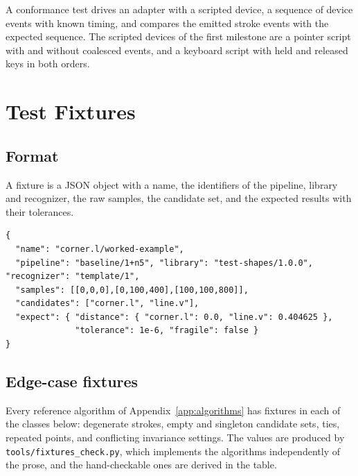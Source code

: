 A conformance test drives an adapter with a scripted device, a sequence of device events with known timing, and compares the emitted stroke events with the expected sequence. The scripted devices of the first milestone are a pointer script with and without coalesced events, and a keyboard script with held and released keys in both orders.

\chapter{Test Fixtures}\label{app:fixtures}

\section{Format}

A fixture is a JSON object with a name, the identifiers of the pipeline, library and recognizer, the raw samples, the candidate set, and the expected results with their tolerances.

\begin{lstlisting}[language=JSONx,caption={A regression fixture (the five-point test profile of the worked example below).},label={lst:fixture}]
{
  "name": "corner.l/worked-example",
  "pipeline": "baseline/1+n5", "library": "test-shapes/1.0.0", "recognizer": "template/1",
  "samples": [[0,0,0],[0,100,400],[100,100,800]],
  "candidates": ["corner.l", "line.v"],
  "expect": { "distance": { "corner.l": 0.0, "line.v": 0.404625 },
              "tolerance": 1e-6, "fragile": false }
}
\end{lstlisting}

\section{Edge-case fixtures}

Every reference algorithm of Appendix~\ref{app:algorithms} has fixtures in each of the classes below: degenerate strokes, empty and singleton candidate sets, ties, repeated points, and conflicting invariance settings. The values are produced by \texttt{tools/fixtures\_check.py}, which implements the algorithms independently of the prose, and the hand-checkable ones are derived in the table.

